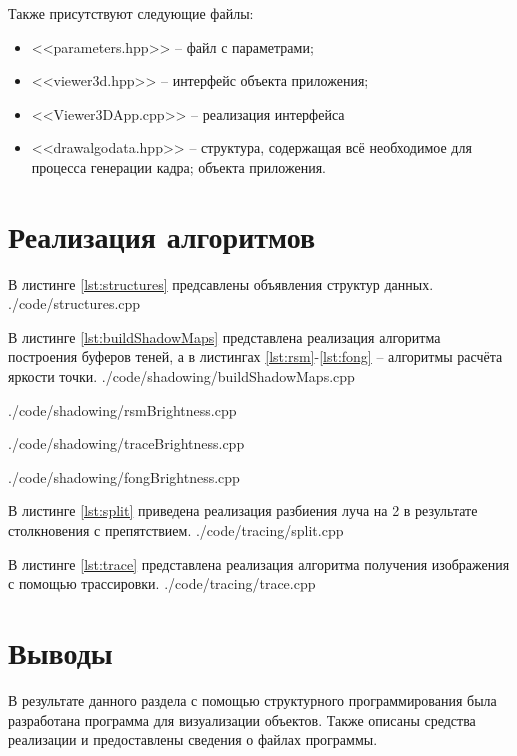 {        Также присутствуют следующие файлы:
        \begin{itemize}
            \item <<parameters.hpp>> -- файл с параметрами;
            \item <<viewer3d.hpp>> -- интерфейс объекта приложения;
            \item <<Viewer3DApp.cpp>> -- реализация интерфейса
            \item <<drawalgodata.hpp>> -- структура, содержащая всё
            необходимое для процесса генерации кадра;
            объекта приложения.
        \end{itemize}
    }

\section{Реализация алгоритмов} {
    В листинге \ref{lst:structures} предсавлены объявления структур данных.
     {./code/structures.cpp}
    
    В листинге \ref{lst:buildShadowMaps} представлена реализация алгоритма
    построения буферов теней, а в листингах \ref{lst:rsm}-\ref{lst:fong} --
    алгоритмы расчёта яркости точки.
     {./code/shadowing/buildShadowMaps.cpp}

     {./code/shadowing/rsmBrightness.cpp}
        
     {./code/shadowing/traceBrightness.cpp}

     {./code/shadowing/fongBrightness.cpp}

    В листинге \ref{lst:split} приведена реализация разбиения луча на 2
    в результате столкновения с препятствием.
     {./code/tracing/split.cpp}

    В листинге \ref{lst:trace} представлена реализация алгоритма получения
    изображения с помощью трассировки.
     {./code/tracing/trace.cpp}
}

\section*{Выводы}
В результате данного раздела с помощью структурного программирования
была разработана программа для визуализации объектов.
Также описаны средства реализации и предоставлены сведения о файлах
программы.